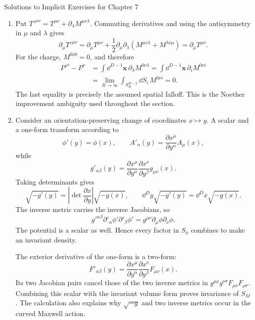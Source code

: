\begin{bankssolutions}{Solutions to Implicit Exercises for Chapter 7}
\begin{enumerate}[label=(\alph*)]
\item Put
$T'^{\mu\nu}=T^{\mu\nu}+\partial_\lambda
M^{\mu\nu\lambda}$.  Commuting derivatives and using the antisymmetry in
$\mu$ and $\lambda$ gives
\[
 \partial_\mu T'^{\mu\nu}
 =\partial_\mu T^{\mu\nu}
 +\frac12\partial_\mu\partial_\lambda
 \left(M^{\mu\nu\lambda}+M^{\lambda\nu\mu}\right)
 =\partial_\mu T^{\mu\nu}.
\]
For the charge, $M^{0\nu0}=0$, and therefore
\begin{align*}
 P'^{\nu}-P^\nu
 &=\int\dd^{D-1}\mathbf x\,\partial_\lambda M^{0\nu\lambda}
 =\int\dd^{D-1}\mathbf x\,\partial_iM^{0\nu i}\\
 &=\lim_{R\to\infty}\int_{S_R^{D-2}}\dd S_i\,M^{0\nu i}=0.
\end{align*}
The last equality is precisely the assumed spatial falloff.  This is the
Noether improvement ambiguity used throughout the section.

\item Consider an orientation-preserving change of coordinates $x\mapsto y$.
A scalar and a one-form transform according to
\[
 \phi'(y)=\phi(x),\qquad
 A'_\alpha(y)=\frac{\partial x^\mu}{\partial y^\alpha}A_\mu(x),
\]
while
\[
 g'_{\alpha\beta}(y)
 =\frac{\partial x^\mu}{\partial y^\alpha}
  \frac{\partial x^\nu}{\partial y^\beta}g_{\mu\nu}(x).
\]
Taking determinants gives
\[
 \sqrt{-g'(y)}
 =\left|\det\frac{\partial x}{\partial y}\right|\sqrt{-g(x)},
 \qquad
 \dd^D y\sqrt{-g'(y)}=\dd^D x\sqrt{-g(x)}.
\]
The inverse metric carries the inverse Jacobians, so
\[
 g'^{\alpha\beta}\partial'_{\alpha}\phi'
 \partial'_{\beta}\phi'
 =g^{\mu\nu}\partial_\mu\phi\partial_\nu\phi.
\]
The potential is a scalar as well.  Hence every factor in $S_\phi$ combines
to make an invariant density.

The exterior derivative of the one-form is a two-form:
\[
 F'_{\alpha\beta}(y)
 =\frac{\partial x^\mu}{\partial y^\alpha}
  \frac{\partial x^\nu}{\partial y^\beta}F_{\mu\nu}(x).
\]
Its two Jacobian pairs cancel those of the two inverse metrics in
$g^{\mu\rho}g^{\nu\sigma}F_{\mu\nu}F_{\rho\sigma}$.  Combining this scalar
with the invariant volume form proves invariance of $S_M$.  The calculation
also explains why $\sqrt{-g}$ and two inverse metrics occur in the curved
Maxwell action.


\end{enumerate}
\end{bankssolutions}
